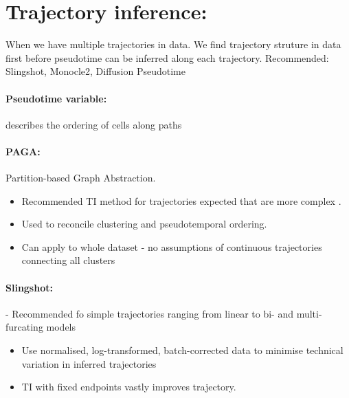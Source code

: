 \documentclass[a4paper,12pt]{article}
\begin{document}
\section{Trajectory inference:} When we have multiple trajectories in data. We find trajectory struture in data first before pseudotime can be inferred along each trajectory. Recommended: Slingshot, Monocle2, Diffusion Pseudotime
\paragraph{Pseudotime variable:} describes the ordering of cells along paths
\paragraph{PAGA:} Partition-based Graph Abstraction.
\begin{itemize}
\item Recommended TI method for trajectories expected that are more complex .
\item Used to reconcile clustering and pseudotemporal ordering.
\item Can apply to whole dataset - no assumptions of continuous trajectories connecting all clusters \end{itemize}
\paragraph{Slingshot:} - Recommended fo simple trajectories ranging from linear to bi- and multi-furcating models
\begin{itemize}
\item Use normalised, log-transformed, batch-corrected data to minimise technical variation in inferred trajectories
\item TI with fixed endpoints vastly improves trajectory. \end{itemize}
\end{document}
